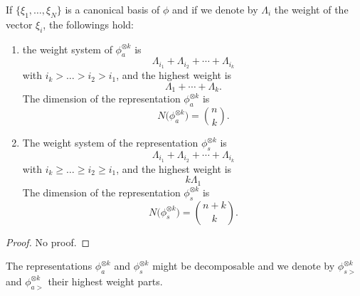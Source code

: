 \begin{proposition}
    If $\{ \xi_1,\ldots,\xi_N \}$ is a canonical basis of $\phi$ and if we denote by $\Lambda_i$ the weight of the vector $\xi_i$, the followings hold:
    \begin{enumerate}
        \item the weight system of $\phi^{\otimes k}_a$ is
            \begin{equation}
                \Lambda_{i_1}+\Lambda_{i_2}+\cdots+\Lambda_{i_k}
            \end{equation}
            with $i_k>\ldots>i_2>i_1$, and the highest weight is
            \begin{equation}
                \Lambda_1+\cdots+\Lambda_k.
            \end{equation}
            The dimension of the representation $\phi^{\otimes k}_a$ is
            \begin{equation}
                N\big( \phi^{\otimes k}_a \big)= {n\choose k}.
            \end{equation}

        \item The weight system of the representation $\phi^{\otimes k}_s$ is
            \begin{equation}
                \Lambda_{i_1}+\Lambda_{i_2}+\cdots+\Lambda_{i_k}
            \end{equation}
            with $i_k\geq \ldots\geq i_2\geq i_1$, and the highest weight is
            \begin{equation}
                k\Lambda_1
            \end{equation}
            The dimension of the representation $\phi^{\otimes k}_s$ is
            \begin{equation}
                N\big( \phi^{\otimes k}_s \big)= {n+k\choose k}.
            \end{equation}
    \end{enumerate}
\end{proposition}

\begin{proof}
    No proof.
\end{proof}
The representations $\phi^{\otimes k}_a$ and $\phi^{\otimes k}_s$ might be decomposable and we denote by $\phi^{\otimes k}_{s>}$ and $\phi^{\otimes k}_{a>}$ their highest weight parts.


